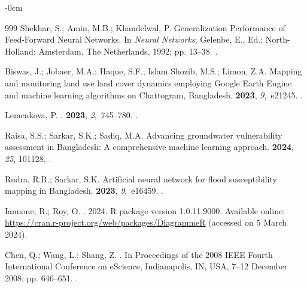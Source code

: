 \documentclass[water,article,accept,pdftex,oneauhor]{Definitions/mdpi}
\begin{document}
{{{\begin{adjustwidth}{-\extralength}{0cm}
\begin{thebibliography}{999}
Shekhar, S.; Amin, M.B.; Khandelwal, P.
\newblock Generalization Performance of Feed-Forward Neural Networks. In {\em
  Neural Networks}; Gelenbe, E., Ed.; North-Holland: Amsterdam,  The Netherlands, 1992; pp.
  13--38.
.

Biswas, J.; Jobaer, M.A.; Haque, S.F.; {Islam Shozib}, M.S.; Limon, Z.A.
\newblock Mapping and monitoring land use land cover dynamics employing Google
  Earth Engine and machine learning algorithms on Chattogram, Bangladesh.
 {\bf 2023}, {\em 9},~e21245.
.

Lemenkova, P.
.
 {\bf 2023}, {\em 2},~745--780.
.

Raisa, S.S.; Sarkar, S.K.; Sadiq, M.A.
\newblock Advancing groundwater vulnerability assessment in Bangladesh: A
  comprehensive machine learning approach.
 {\bf 2024},  \emph{25}, 101128.
.

Rudra, R.R.; Sarkar, S.K.
\newblock Artificial neural network for flood susceptibility mapping in
  Bangladesh.
 {\bf 2023}, {\em 9},~e16459.
.

Iannone, R.; Roy, O.
.  2024.
\newblock R package version 1.0.11.9000. Available online: %
  \url{https://cran.r-project.org/web/packages/DiagrammeR} (accessed on 5 March 2024).

Chen, Q.; Wang, L.; Shang, Z.
.
\newblock In Proceedings of the 2008 IEEE Fourth International Conference on
  eScience,  Indianapolis, IN, USA, 7--12 December 2008; pp. 646--651.
.


\end{thebibliography}
\end{adjustwidth}}}}
\end{document}
